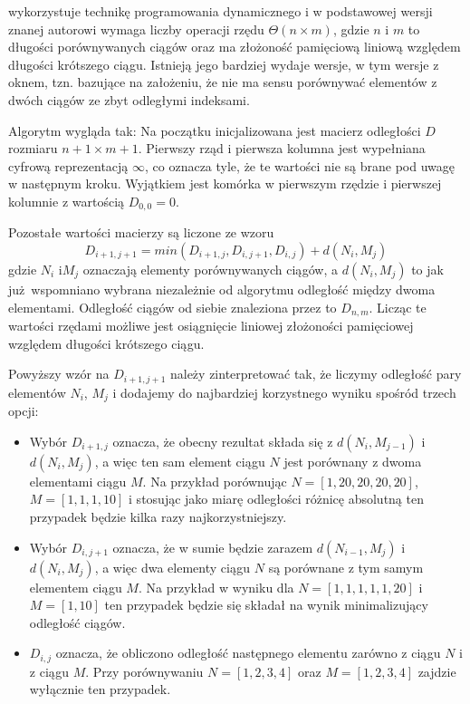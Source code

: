 wykorzystuje technikę programowania dynamicznego i w podstawowej wersji znanej autorowi wymaga liczby operacji
rzędu $\Theta(n \times m)$, gdzie $n$ i $m$ to długości porównywanych ciągów oraz ma złożoność pamięciową liniową
względem długości krótszego ciągu. Istnieją jego bardziej wydaje wersje, w tym wersje z oknem, tzn. bazujące na
założeniu, że nie ma sensu porównywać elementów z dwóch ciągów ze zbyt odległymi indeksami.

Algorytm wygląda tak: Na początku inicjalizowana jest macierz odległości $D$ rozmiaru $n + 1 \times m + 1$. Pierwszy
rząd i pierwsza kolumna jest wypełniana cyfrową reprezentacją $\infty$, co oznacza tyle,
że te wartości nie są brane pod uwagę w następnym kroku.
Wyjątkiem jest komórka w pierwszym rzędzie i pierwszej kolumnie z wartością $D_{0,0} = 0$.

Pozostałe wartości macierzy są liczone ze wzoru
$$D_{i+1, j+1} = min(D_{i+1, j}, D_{i, j+1}, D_{i, j}) + d(N_i, M_j)$$
gdzie $N_i$ i$M_j$ oznaczają elementy porównywanych ciągów, a $d(N_i, M_j)$ to jak już wspomniano wybrana
niezależnie od algorytmu odległość między dwoma elementami. Odległość ciągów od siebie znaleziona przez 
to $D_{n, m}$.  Licząc te wartości rzędami możliwe jest osiągnięcie liniowej złożoności pamięciowej względem
długości krótszego ciągu.

Powyższy wzór na $D_{i+1, j+1}$ należy zinterpretować tak, że liczymy odległość pary elementów $N_i$, $M_j$ i dodajemy
do najbardziej korzystnego wyniku spośród trzech opcji:

\begin{itemize}
    \item Wybór $D_{i+1, j}$ oznacza, że obecny rezultat składa się z $d(N_i, M_{j-1})$ i $d(N_i, M_j)$, a więc ten sam element ciągu $N$ jest porównany z dwoma elementami ciągu $M$. Na przykład porównując $N = [1, 20, 20, 20, 20]$, $M = [1, 1, 1, 10]$ i stosując jako miarę odległości różnicę absolutną ten przypadek będzie kilka razy najkorzystniejszy.
    \item Wybór $D_{i, j+1}$ oznacza, że w sumie będzie zarazem $d(N_{i-1}, M_j)$ i $d(N_i, M_j)$, a więc dwa elementy ciągu $N$ są porównane z tym samym elementem ciągu $M$. Na przykład w wyniku dla $N = [1, 1, 1, 1, 1, 20]$ i $ M = [1, 10]$ ten przypadek będzie się składał na wynik minimalizujący odległość ciągów.
    \item $D_{i, j}$ oznacza, że obliczono odległość następnego elementu zarówno z ciągu $N$ i z ciągu $M$. Przy porównywaniu $N = [1, 2, 3, 4]$ oraz $M = [1, 2, 3, 4]$ zajdzie wyłącznie ten przypadek.
\end{itemize}

